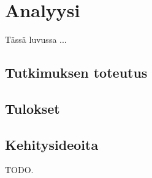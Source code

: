 
\chapter{Analyysi}

Tässä luvussa ...

\section{Tutkimuksen toteutus}

\section{Tulokset}

\section{Kehitysideoita}

TODO.
